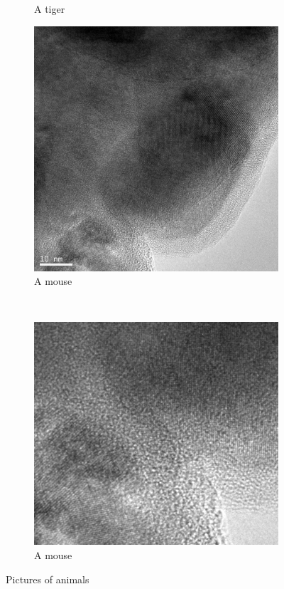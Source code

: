 \documentclass[12pt,a4paper]{article}
\begin{document}
\begin{figure}
\begin{subfigure}[b]{0.45\textwidth}
    \caption{A tiger}
    \label{fig:tiger}
  \end{subfigure}
  
  \begin{subfigure}[b]{0.45\textwidth}
    \includegraphics[width=\textwidth]{Data/Fe3O4-SiO2-0003.png}
    \caption{A mouse}
    \label{fig:mouse}
  \end{subfigure}
  ~
  \begin{subfigure}[b]{0.45\textwidth}
    \includegraphics[width=\textwidth]{Data/Fe3O4-SiO2-0003-zoom.png}
    \caption{A mouse}
    \label{fig:Zoom}
  \end{subfigure}
  
  \caption{Pictures of animals}\label{fig:brightfield}
\end{figure}
\end{document}
